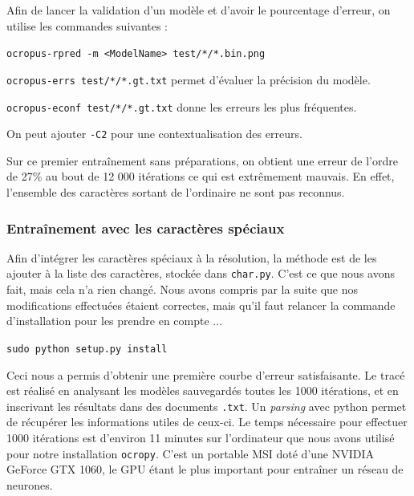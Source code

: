 \documentclass{report}
\begin{document}
Afin de lancer la validation d'un modèle et d'avoir le pourcentage d'erreur, on utilise les commandes suivantes :

\begin{center}
    \texttt{ocropus-rpred -m <ModelName> test/*/*.bin.png}

    \texttt{ocropus-errs test/*/*.gt.txt} permet d'évaluer la précision du modèle.

    \texttt{ocropus-econf test/*/*.gt.txt} donne les erreurs les plus fréquentes.
\end{center}

On peut ajouter \texttt{-C2} pour une contextualisation des erreurs.

Sur ce premier entraînement sans préparations, on obtient une erreur de l'ordre de 27\% au bout de 12 000 itérations ce qui est extrêmement mauvais. En effet, l'ensemble des caractères sortant de l'ordinaire ne sont pas reconnus.

\subsubsection{Entraînement avec les caractères spéciaux}

Afin d'intégrer les caractères spéciaux à la résolution, la méthode est de les ajouter à la liste des caractères, stockée dans \texttt{char.py}. C'est ce que nous avons fait, mais cela n'a rien changé. Nous avons compris par la suite que nos modifications effectuées étaient correctes, mais qu'il faut relancer la commande d'installation pour les prendre en compte ...

\begin{center}
    \texttt{sudo python setup.py install}
\end{center}

Ceci nous a permis d'obtenir une première courbe d'erreur satisfaisante.
Le tracé est réalisé en analysant les modèles sauvegardés toutes les 1000 itérations, et en inscrivant les résultats dans des documents \texttt{.txt}.
Un \textit{parsing} avec python permet de récupérer les informations utiles de ceux-ci. 
Le temps nécessaire pour effectuer 1000 itérations est d'environ 11 minutes sur l'ordinateur que nous avons utilisé pour notre installation \texttt{ocropy}.
C'est un portable MSI doté d'une NVIDIA GeForce GTX 1060, le GPU étant le plus important pour entraîner un réseau de neurones.
\end{document}
